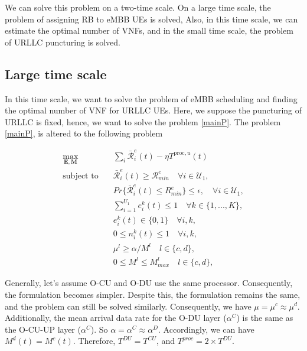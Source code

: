 \documentclass[conference]{IEEEtran}
\begin{document}
We can solve this problem on a two-time scale. On a large time scale, the problem of assigning RB to eMBB UEs is solved,
Also, in this time scale, we can estimate the optimal number of VNFs, and in the small time scale, the problem of URLLC puncturing is solved. 
\subsection{Large time scale}
In this time scale, we want to solve the problem of eMBB scheduling and finding the optimal number of VNF for URLLC UEs.
Here, we suppose the puncturing of URLLC is fixed, hence, we want to solve the problem \eqref{mainP}.
The problem \eqref{mainP}, is altered to the following problem


\begin{subequations} \label{mainP1}
\begin{alignat}{4}
\max\limits_{ \boldsymbol{E},\boldsymbol{M} } &  \sum_i \bar{\mathcal{R}}_{i}^e(t) - \eta T^{\text{proc}, u}(t)       \ \\
\text{subject to} \quad  & \bar{\mathcal{R}}_{i}^e(t) \geq  \mathcal{R}_{min}^e \quad \forall i \in \mathcal{U}_1, \label{p1} \\
& Pr\{\bar{\mathcal{R}}_{i}^e(t) \leq {R}_{min}^e\}  \leq \epsilon,\quad \forall i \in \mathcal{U}_1, \label{p12}\\
&\sum_{i=1}^{U_1}e^k_i(t)\leq 1 \quad \forall k \in \{1,...,K\},\label{p15} \\
&e^k_i(t)\in \{0,1\}  \quad \forall i,k, \label{p16} \\
& 0 \leq n^k_i(t)\leq 1  \quad \forall i,k, \label{p17} \\
& \mu^l \geq \alpha/M^l \quad l \in \{c,d\},\label{p18} \\
& 0 \leq M^l \leq M_{max}^l  \quad l \in \{c,d\},\label{p110}
\end{alignat}
\label{constraints}
\end{subequations}

Generally, let's assume O-CU and O-DU use the same processor. 
Consequently, the formulation becomes simpler. Despite this, the formulation remains the same, and the problem can still be solved similarly. 
Consequently, we have $\mu = \mu^c \approx \mu^d $. Additionally, the mean arrival data rate for the O-DU layer ($\alpha^C$) is the same as the O-CU-UP layer ($\alpha^C$). So $\alpha = \alpha^C \approx \alpha^D$. 
Accordingly, we can have $M^d(t) = M^c(t)$. Therefore, $T^{DU} = T^{CU}$, and $T^{proc} =2\times T^{DU}$.
\end{document}
